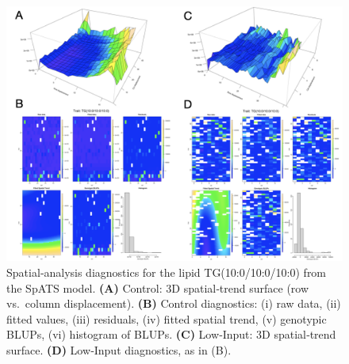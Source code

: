 \documentclass[10pt,letterpaper]{article}
\begin{document}
\begin{figure}[htp]
  \centering
  \includegraphics[width=\textwidth]{fig/supp/SuppFig3.png}
  \caption{
    Spatial‐analysis diagnostics for the lipid TG(10:0/10:0/10:0) from the SpATS model. 
    {\bf(A)} Control: 3D spatial‐trend surface (row vs.\ column displacement). 
    {\bf(B)} Control diagnostics: (i) raw data, (ii) fitted values, (iii) residuals, (iv) fitted spatial trend, (v) genotypic BLUPs, (vi) histogram of BLUPs. 
    {\bf(C)} Low‐Input: 3D spatial‐trend surface. 
    {\bf(D)} Low‐Input diagnostics, as in (B).
  }
  \label{fig:S3}
\end{figure}






\end{document}
